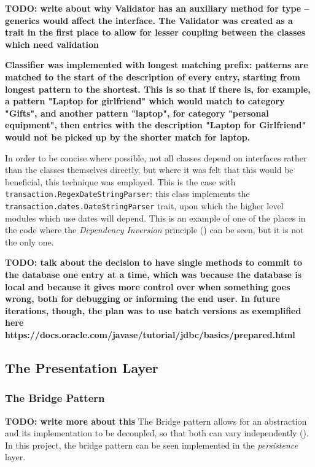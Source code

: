 \textbf{TODO: write about why Validator has an auxiliary method for type --
generics would affect the interface. The Validator was created as a trait in
the first place to allow for lesser coupling between the classes which need
validation}

\textbf{Classifier was implemented with longest matching prefix: patterns are
matched to the start of the description of every entry, starting from longest
pattern to the shortest. This is so that if there is, for example, a pattern
"Laptop for girlfriend" which would match to category "Gifts", and another
pattern "laptop", for category "personal equipment", then entries with the
description "Laptop for Girlfriend" would not be picked up by the shorter match
for laptop.}

In order to be concise where possible, not all classes depend on interfaces
rather than the classes themselves directly, but where it was felt that this
would be beneficial, this technique was employed. This is the case with
\texttt{transaction.RegexDateStringParser}: this class implements the
\texttt{transaction.dates.DateStringParser} trait, upon which the higher level
modules which use dates will depend. This is an example of one of the places in
the code where the \emph{Dependency Inversion} principle
(\cite[][]{martin1996dependency}) can be seen, but it is not the only one.

\textbf{TODO: talk about the decision to have single methods to commit to the
database one entry at a time, which was because the database is local and
because it gives more control over when something goes wrong, both for
debugging or informing the end user. In future iterations, though, the plan was
to use batch versions as exemplified here
https://docs.oracle.com/javase/tutorial/jdbc/basics/prepared.html}


\subsection{The Presentation Layer}


\subsubsection{The Bridge Pattern} \label{sec:Implementation.TheBridgePattern}
\textbf{TODO: write more about this}
The Bridge pattern allows for an abstraction and its implementation to be
decoupled, so that both can vary independently
(\cite[][Ch.~7,Location~2699]{nikolov2016scala}). In this project, the bridge
pattern can be seen implemented in the \emph{persistence} layer.

